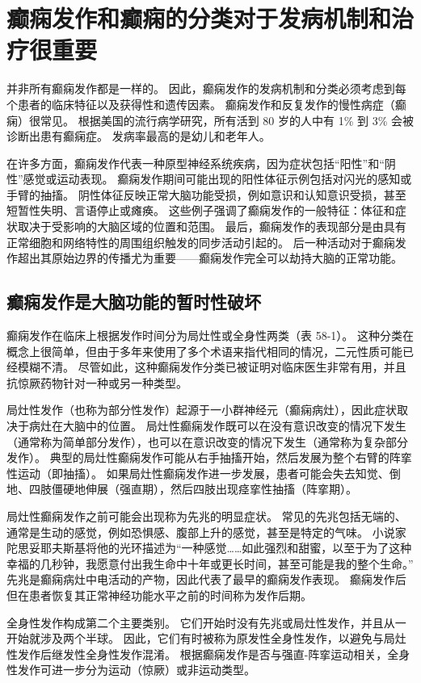 \section{癫痫发作和癫痫的分类对于发病机制和治疗很重要}
并非所有癫痫发作都是一样的。 因此，癫痫发作的发病机制和分类必须考虑到每个患者的临床特征以及获得性和遗传因素。 癫痫发作和反复发作的慢性病症（癫痫）很常见。 根据美国的流行病学研究，所有活到 80 岁的人中有 1\% 到 3\% 会被诊断出患有癫痫症。 发病率最高的是幼儿和老年人。

在许多方面，癫痫发作代表一种原型神经系统疾病，因为症状包括“阳性”和“阴性”感觉或运动表现。 癫痫发作期间可能出现的阳性体征示例包括对闪光的感知或手臂的抽搐。 阴性体征反映正常大脑功能受损，例如意识和认知意识受损，甚至短暂性失明、言语停止或瘫痪。 这些例子强调了癫痫发作的一般特征：体征和症状取决于受影响的大脑区域的位置和范围。 最后，癫痫发作的表现部分是由具有正常细胞和网络特性的周围组织触发的同步活动引起的。 后一种活动对于癫痫发作超出其原始边界的传播尤为重要——癫痫发作完全可以劫持大脑的正常功能。

\subsection{癫痫发作是大脑功能的暂时性破坏}
癫痫发作在临床上根据发作时间分为局灶性或全身性两类（表 58-1）。 这种分类在概念上很简单，但由于多年来使用了多个术语来指代相同的情况，二元性质可能已经模糊不清。 尽管如此，这种癫痫发作分类已被证明对临床医生非常有用，并且抗惊厥药物针对一种或另一种类型。

局灶性发作（也称为部分性发作）起源于一小群神经元（癫痫病灶），因此症状取决于病灶在大脑中的位置。 局灶性癫痫发作既可以在没有意识改变的情况下发生（通常称为简单部分发作），也可以在意识改变的情况下发生（通常称为复杂部分发作）。 典型的局灶性癫痫发作可能从右手抽搐开始，然后发展为整个右臂的阵挛性运动（即抽搐）。 如果局灶性癫痫发作进一步发展，患者可能会失去知觉、倒地、四肢僵硬地伸展（强直期），然后四肢出现痉挛性抽搐（阵挛期）。

局灶性癫痫发作之前可能会出现称为先兆的明显症状。 常见的先兆包括无端的、通常是生动的感觉，例如恐惧感、腹部上升的感觉，甚至是特定的气味。 小说家陀思妥耶夫斯基将他的光环描述为“一种感觉……如此强烈和甜蜜，以至于为了这种幸福的几秒钟，我愿意付出我生命中十年或更长时间，甚至可能是我的整个生命。” 先兆是癫痫病灶中电活动的产物，因此代表了最早的癫痫发作表现。 癫痫发作后但在患者恢复其正常神经功能水平之前的时间称为发作后期。

全身性发作构成第二个主要类别。 它们开始时没有先兆或局灶性发作，并且从一开始就涉及两个半球。 因此，它们有时被称为原发性全身性发作，以避免与局灶性发作后继发性全身性发作混淆。 根据癫痫发作是否与强直-阵挛运动相关，全身性发作可进一步分为运动（惊厥）或非运动类型。


